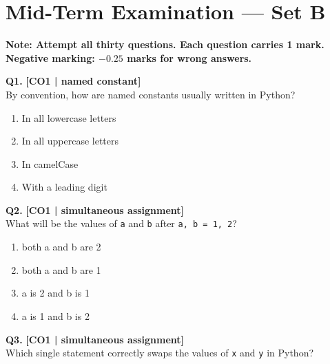 \section{Mid-Term Examination --- Set B}


\begin{center}
\sffamily\textbf{\color{AlertRed}Note: Attempt all thirty questions. Each question carries 1 mark. Negative marking: $-0.25$ marks for wrong answers.}
\end{center}

\noindent\textbf{Q1.} \hfill {\small\color{LPUOrange}\textbf{[CO1 | named constant]}}\\[2pt]
By convention, how are named constants usually written in Python?

\begin{enumerate}[label=(\alph*),topsep=2pt,itemsep=1pt,partopsep=0pt,parsep=0pt]
    \item \relax In all lowercase letters
    \item \relax In all uppercase letters
    \item \relax In camelCase
    \item \relax With a leading digit
\end{enumerate}
\vspace{{2mm}}

\noindent\textbf{Q2.} \hfill {\small\color{LPUOrange}\textbf{[CO1 | simultaneous assignment]}}\\[2pt]
What will be the values of \texttt{a} and \texttt{b} after \texttt{a, b = 1, 2}?

\begin{enumerate}[label=(\alph*),topsep=2pt,itemsep=1pt,partopsep=0pt,parsep=0pt]
    \item \relax both a and b are 2
    \item \relax both a and b are 1
    \item \relax a is 2 and b is 1
    \item \relax a is 1 and b is 2
\end{enumerate}
\vspace{{2mm}}

\noindent\textbf{Q3.} \hfill {\small\color{LPUOrange}\textbf{[CO1 | simultaneous assignment]}}\\[2pt]
Which single statement correctly swaps the values of \texttt{x} and \texttt{y} in Python?

